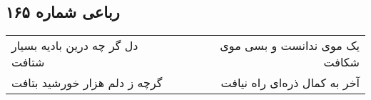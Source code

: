 \begin{center}
\section*{رباعی شماره ۱۶۵}
\label{sec:sh165}
\begin{longtable}{l p{0.5cm} r}
دل گر چه درین بادیه بسیار شتافت
&&
یک موی ندانست و بسی موی شکافت
\\
گرچه ز دلم هزار خورشید بتافت
&&
آخر به کمال ذره‌ای راه نیافت
\\
\end{longtable}
\end{center}
